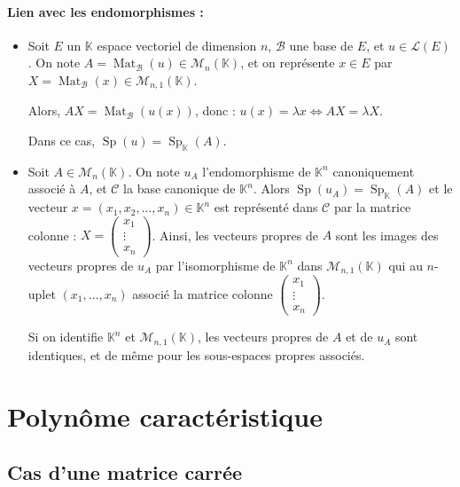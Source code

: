 \documentclass[12pt]{book}
\let\ensembleNombre\mathbb
\newcommand*\K{\ensuremath{\ensembleNombre{K}}}
\DeclareMathOperator{\Sp}{Sp}
\DeclareMathOperator{\Mat}{Mat}
\theoremstyle{definition}
\theoremstyle{remark}
\begin{document}
	\paragraph{Lien avec les endomorphismes :}
	\begin{itemize}
	\item Soit $E$ un $\K$ espace vectoriel de dimension $n$, $\mathcal B$ une base de $E$, et $u \in \mathcal L(E)$. On note $A = \Mat_{\mathcal B}(u) \in \mathcal M_n(\K)$, et on représente $x \in E$ par $X = \Mat_{\mathcal B}(x) \in \mathcal M_{n,1}(\K)$.
	
	Alors, $AX = \Mat_{\mathcal B}(u(x))$, donc : $\boxed{ u(x) = \lambda x \Longleftrightarrow AX = \lambda X. }$
	
	Dans ce cas, $\boxed{ \Sp(u) = \Sp_\K(A).}$
	
	\item Soit $A \in \mathcal M_n(\K)$. On note $u_A$ l'endomorphisme de $\K^n$ canoniquement associé à $A$, et $\mathcal C$ la base canonique de $\K^n$. Alors $\Sp(u_A) = \Sp_\K(A)$ et le vecteur $x = (x_1, x_2, \ldots, x_n) \in \K^n$ est représenté dans $\mathcal C$ par la matrice colonne : $X = \begin{pmatrix} x_1 \\ \vdots \\ x_n \end{pmatrix}$. Ainsi, les vecteurs propres de $A$ sont les images des vecteurs propres de $u_A$ par l'isomorphisme de $\K^n$ dans $\mathcal M_{n,1}(\K)$ qui au $n$-uplet $(x_1, \ldots, x_n)$ associé la matrice colonne $\begin{pmatrix} x_1 \\ \vdots \\ x_n \end{pmatrix}$.
	
	Si on identifie $\K^n$ et $\mathcal M_{n,1}(\K)$, les vecteurs propres de $A$ et de $u_A$ sont identiques, et de même pour les sous-espaces propres associés.
	\end{itemize}
	
	\section{Polynôme caractéristique}
	\subsection{Cas d'une matrice carrée}
	
\end{document}
